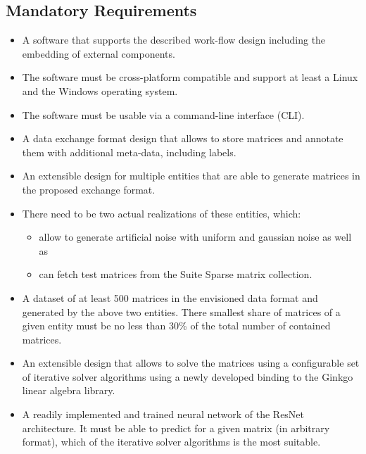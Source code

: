 \documentclass[parskip=full]{scrartcl}
\begin{document}
\subsection{Mandatory Requirements}
\begin{itemize}

\item A software that supports the described work-flow design including the embedding of external components.

\item The software must be cross-platform compatible and support at least a \gls{Linux} and the \gls{Windows} operating system.

\item The software must be usable via a \gls{command-line interface} (CLI).

\item A data exchange format design that allows to store matrices and annotate them with 
additional meta-data, including labels.

\item An extensible design for multiple entities that are able to generate matrices in the proposed exchange format.

\item There need to be two actual realizations of these entities, which:

\begin{itemize}
    \item allow to generate artificial noise with uniform and \gls{gaussian noise} as well as
    
    \item can fetch test matrices from the \gls{Suite Sparse} matrix collection.
\end{itemize}

\item A dataset of at least 500 matrices in the envisioned data format and generated by the above two entities. There smallest share of matrices of a given entity must be no less than 30\% of the total number of contained matrices.

\item An extensible design that allows to solve the matrices using a configurable set of \gls{iterative solver} algorithms using a newly developed binding to the \gls{Ginkgo} linear algebra library.

\item A readily implemented and trained \gls{neural network} of the \gls{ResNet} architecture. It must be able to predict for a given matrix (in arbitrary format), which of the \gls{iterative solver} algorithms is the most suitable.


\end{itemize}
\end{document}
